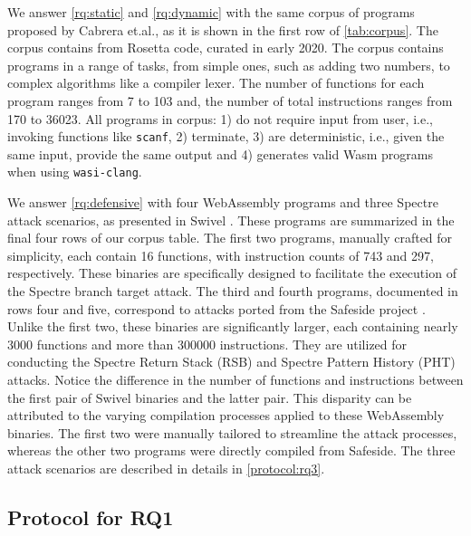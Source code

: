 \documentclass[sigplan,screen]{acmart}
\newcommand{\wasm}{Wasm\xspace}
\newcommand{\Wasm}{WebAssembly\xspace}
\newcommand{\etal}{et.al.\xspace}
\newcommand{\ie}{i.e.,\xspace}
\begin{document}
We answer \ref{rq:static} and \ref{rq:dynamic} with the same corpus of programs proposed by Cabrera \etal \cite{arteaga2020crow}, as it is shown in the first row of \autoref{tab:corpus}.
The corpus contains \nProgramsRosetta from Rosetta code, curated in early 2020.
The corpus contains programs in a range of tasks, from simple ones, such as adding two numbers, to complex algorithms like a compiler lexer. 
The number of functions for each program ranges from 7 to 103 and, the number of total instructions ranges from 170 to 36023.
All programs in corpus: 1) do not require input from user, \ie invoking functions like \texttt{scanf}, 2) terminate, 3) are deterministic, \ie given the same input, provide the same output and 4) generates valid \wasm programs when using \texttt{wasi-clang}.

We answer \ref{rq:defensive} with four \Wasm programs and three Spectre attack scenarios, as presented in Swivel \cite{Swivel}. 
These programs are summarized in the final four rows of our corpus table.
The first two programs, manually crafted for simplicity, each contain 16 functions, with instruction counts of 743 and 297, respectively. These binaries are specifically designed to facilitate the execution of the Spectre branch target attack.
The third and fourth programs, documented in rows four and five, correspond to attacks ported from the Safeside project \cite{safeside}. 
Unlike the first two, these binaries are significantly larger, each containing nearly 3000 functions and more than 300000 instructions. 
They are utilized for conducting the Spectre Return Stack (RSB) and Spectre Pattern History (PHT) attacks.
Notice the difference in the number of functions and instructions between the first pair of Swivel binaries and the latter pair. 
This disparity can be attributed to the varying compilation processes applied to these \Wasm binaries. 
The first two were manually tailored to streamline the attack processes, whereas the other two programs were directly compiled from Safeside.
The three attack scenarios are described in details in \autoref{protocol:rq3}.

\subsection{Protocol for RQ1}
\label{protocol:rq1}
\end{document}
